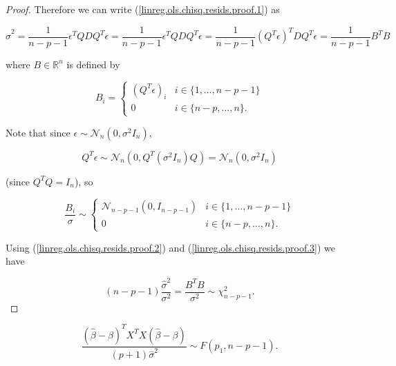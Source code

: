 \begin{proof}
Therefore we can write (\ref{linreg.ols.chisq.resids.proof.1}) as 

\begin{equation}\label{linreg.ols.chisq.resids.proof.2}
\hat{\sigma}^2 =  \frac{1}{n - p - 1} \epsilon^TQ D Q^T \epsilon  =  \frac{1}{n - p - 1} \epsilon^T Q D Q^T \epsilon  =  \frac{1}{n - p - 1} (Q^T \epsilon )^T D Q^T \epsilon  =  \frac{1}{n - p - 1} B^TB
\end{equation}

where \(B \in \mathbb{R}^n\) is defined by

\[
B_{i} =  \begin{cases}
(Q^T \epsilon)_{i} & i \in \{1, \ldots, n - p - 1\} \\
0 & i \in \{n - p, \ldots, n\} .
\end{cases}
\]

Note that since \(\epsilon \sim \mathcal{N}_n (0, \sigma^2 I_n)\),

\[
Q^T \epsilon \sim \mathcal{N}_n \left(0, Q^T  ( \sigma^2 I_n) Q \right) = \mathcal{N}_n \left(0,  \sigma^2 I_n  \right)
\]

(since \(Q^TQ = I_n\)), so

\begin{equation}\label{linreg.ols.chisq.resids.proof.3}
\frac{B_i}{\sigma} \sim \begin{cases}
\mathcal{N}_{n - p - 1} \left(0, I_{n - p - 1} \right) & i \in \{1, \ldots, n - p - 1\} \\
0 & i \in \{n -p, \ldots, n\}.
\end{cases}
\end{equation}

Using (\ref{linreg.ols.chisq.resids.proof.2}) and (\ref{linreg.ols.chisq.resids.proof.3}) we have

\begin{equation}\label{linreg.ols.chisq.resids.proof.4}
(n - p - 1) \frac{ \hat{\sigma}^2}{\sigma^2} = \frac{B^TB}{\sigma^2} \sim \chi_{n - p - 1}^2.
\end{equation}


\end{proof}



\begin{proposition}

\[
\frac{(\hat{\beta} - \beta)^T X^TX (\hat{\beta} - \beta)}{(p+1)\hat{\sigma}^2} \sim F(p_1, n - p - 1).
\]

\end{proposition}

